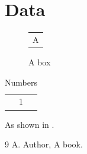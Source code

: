 \documentclass{article}
\begin{document}
\begin{abstract}
A short summary.
\end{abstract}
\tableofcontents
\listoffigures
\section{Data}
\begin{figure}[h]
\centering
\begin{tabular}{c}A\end{tabular}
\caption{A box}
\end{figure}
\begin{table}[h]
\centering
\caption{Numbers}
\begin{tabular}{c}1\end{tabular}
\end{table}
As shown in \cite{k}.
\begin{thebibliography}{9}
 A. Author, A book.
\end{thebibliography}
\end{document}
